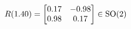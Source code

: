 \documentclass[preview]{standalone}
\begin{document}
\begin{align*}
\special{dvisvgm:raw <g id='unique000'>}R(1.40) = \begin{bmatrix} 0.17 & -0.98 \\ 0.98 & 0.17 \end{bmatrix} \in \text{SO}(2)\special{dvisvgm:raw </g>}
\end{align*}
\end{document}
